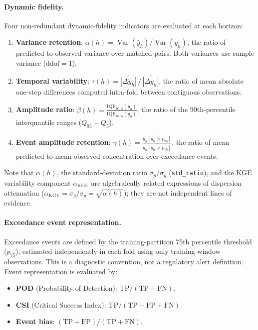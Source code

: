 \documentclass[12pt]{article}
\begin{document}
\paragraph{Dynamic fidelity.}
Four non-redundant dynamic-fidelity indicators are evaluated at each horizon:
\begin{enumerate}
  \item \textbf{Variance retention}:
    $\alpha(h) = \operatorname{Var}(\hat{y}_h) / \operatorname{Var}(y_h)$,
    the ratio of predicted to observed variance over matched pairs. Both variances use sample variance ($\mathrm{ddof}=1$).
  \item \textbf{Temporal variability}:
    $\tau(h) = \overline{|\Delta\hat{y}_h|} \,/\, \overline{|\Delta y_h|}$,
    the ratio of mean absolute one-step differences computed intra-fold between contiguous observations.
  \item \textbf{Amplitude ratio}:
    $\beta(h) = \frac{\mathrm{IQR}_{95\text{--}5}(\hat{y}_h)}{\mathrm{IQR}_{95\text{--}5}(y_h)}$,
    the ratio of the 90th-percentile interquantile ranges ($Q_{95} - Q_5$).
  \item \textbf{Event amplitude retention}:
    $\gamma(h) = \frac{\overline{\hat{y}_h[y_h > p_{75}]}}{\overline{y_h[y_h > p_{75}]}} $,
    the ratio of mean predicted to mean observed concentration over exceedance events.
\end{enumerate}
Note that $\alpha(h)$, the standard-deviation ratio $\sigma_{\hat{y}} / \sigma_{y}$ (\texttt{std\_ratio}), and the KGE variability component $\alpha_\mathrm{KGE}$ are algebraically related expressions of dispersion attenuation ($\alpha_\mathrm{KGE} = \sigma_{\hat{y}} / \sigma_{y} = \sqrt{\alpha(h)}$); they are not independent lines of evidence.

\paragraph{Exceedance event representation.}
Exceedance events are defined by the training-partition 75th percentile threshold ($p_{75}$), estimated independently in each fold using only training-window observations. This is a diagnostic convention, not a regulatory alert definition. Event representation is evaluated by:
\begin{itemize}
  \item \textbf{POD} (Probability of Detection):
    $\mathrm{TP} / (\mathrm{TP} + \mathrm{FN})$.
  \item \textbf{CSI} (Critical Success Index):
    $\mathrm{TP} / (\mathrm{TP} + \mathrm{FP} + \mathrm{FN})$.
  \item \textbf{Event bias}:
    $(\mathrm{TP} + \mathrm{FP}) / (\mathrm{TP} + \mathrm{FN})$.
\end{itemize}
\end{document}
